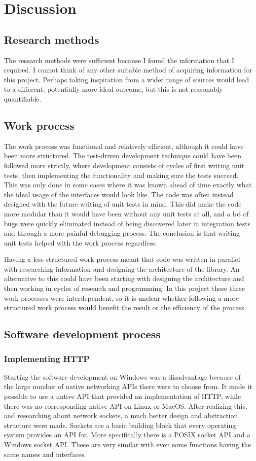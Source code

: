 \documentclass[12pt, a4paper]{article}
\begin{document}
\clearpage
\section{Discussion}
\subsection{Research methods}
The research methods were sufficient because I found the information that I required. I cannot think of any other suitable method of acquiring information for this project. Perhaps taking inspiration from a wider range of sources would lead to a different, potentially more ideal outcome, but this is not reasonably quantifiable.
\subsection{Work process}
The work process was functional and relatively efficient, although it could have been more structured. The test-driven development technique could have been followed more strictly, where development consists of cycles of first writing unit tests, then implementing the functionality and making sure the tests succeed. This was only done in some cases where it was known ahead of time exactly what the ideal usage of the interfaces would look like. The code was often instead designed with the future writing of unit tests in mind. This did make the code more modular than it would have been without any unit tests at all, and a lot of bugs were quickly eliminated instead of being discovered later in integration tests and through a more painful debugging process. The conclusion is that writing unit tests helped with the work process regardless.

Having a less structured work process meant that code was written in parallel with researching information and designing the architecture of the library. An alternative to this could have been starting with designing the architecture and then working in cycles of research and programming. In this project these three work processes were interdependent, so it is unclear whether following a more structured work process would benefit the result or the efficiency of the process.
\subsection{Software development process}
\subsubsection{Implementing HTTP}
Starting the software development on Windows was a disadvantage because of the large number of native networking APIs there were to choose from. It made it possible to use a native API that provided an implementation of HTTP, while there was no corresponding native API on Linux or MacOS. After realizing this, and researching about network sockets, a much better design and abstraction structure were made. Sockets are a basic building block that every operating system provides an API for. More specifically there is a POSIX socket API and a Windows socket API. These are very similar with even some functions having the same names and interfaces. 
\end{document}
